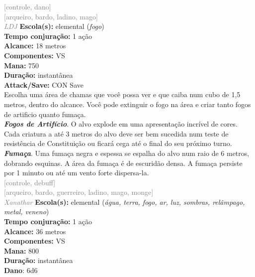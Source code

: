 \documentclass{RPG_Adventure}[2021/10/20]
\begin{document}
{\scriptsize \textcolor{gray}{[controle, dano]\\}}
{\scriptsize \textcolor{gray}{[arqueiro, bardo, ladino, mago]\\}}
{\tiny \textcolor{gray}{\textit{LDJ}}}\jump{}
{\small \t \textbf{Escola(s):} elemental (\textit{fogo})\\\t \textbf{Tempo conjuração:} 1 ação\\\t \textbf{Alcance:} 18 metros\\\t \textbf{Componentes:} VS\\\t \textbf{Mana:} 750\\\t \textbf{Duração:} instantânea\\\t \textbf{Attack/Save:} CON Save\\}
{\normalsize Escolha uma área de chamas que você possa ver e que caiba num cubo de 1,5 metros, dentro do alcance. Você pode extinguir o fogo na área e criar tanto fogos de artificio quanto fumaça.\\\t \textbf{\textit{Fogos de Artifício}}. O alvo explode em uma apresentação incrível de cores. Cada criatura a até 3 metros do alvo deve ser bem sucedida num teste de resistência de Constituição ou ficará cega até o final do seu próximo turno.\\\t \textbf{\textit{Fumaça}}. Uma fumaça negra e espessa se espalha do alvo num raio de 6 metros, dobrando esquinas. A área da fumaça é de escuridão densa.  A fumaça persiste por 1 minuto ou até um vento forte dispersa-la.\\}
{\scriptsize \textcolor{gray}{[controle, debuff]\\}}
{\scriptsize \textcolor{gray}{[arqueiro, bardo, guerreiro, ladino, mago, monge]\\}}
{\tiny \textcolor{gray}{\textit{Xanathar}}}\jump{}
{\small \t \textbf{Escola(s):} elemental (\textit{água, terra, fogo, ar, luz, sombras, relâmpago, metal, veneno})\\\t \textbf{Tempo conjuração:} 1 ação\\\t \textbf{Alcance:} 36 metros\\\t \textbf{Componentes:} VS\\\t \textbf{Mana:} 800\\\t \textbf{Duração:} instantânea\\\t \textbf{Dano}: 6d6\\}
\end{document}
